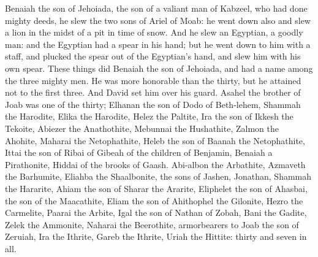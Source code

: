 Benaiah the son of Jehoiada, the son of a valiant man of Kabzeel, who had done mighty deeds, he slew the two sons of Ariel of Moab: he went down also and slew a lion in the midst of a pit in time of snow. And he slew an Egyptian, a goodly man: and the Egyptian had a spear in his hand; but he went down to him with a staff, and plucked the spear out of the Egyptian’s hand, and slew him with his own spear. These things did Benaiah the son of Jehoiada, and had a name among the three mighty men. He was more honorable than the thirty, but he attained not to the first three. And David set him over his guard.  Asahel the brother of Joab was one of the thirty; Elhanan the son of Dodo of Beth-lehem, Shammah the Harodite, Elika the Harodite, Helez the Paltite, Ira the son of Ikkesh the Tekoite, Abiezer the Anathothite, Mebunnai the Hushathite, Zalmon the Ahohite, Maharai the Netophathite, Heleb the son of Baanah the Netophathite, Ittai the son of Ribai of Gibeah of the children of Benjamin, Benaiah a Pirathonite, Hiddai of the brooks of Gaash. Abi-albon the Arbathite, Azmaveth the Barhumite, Eliahba the Shaalbonite, the sons of Jashen, Jonathan, Shammah the Hararite, Ahiam the son of Sharar the Ararite, Eliphelet the son of Ahasbai, the son of the Maacathite, Eliam the son of Ahithophel the Gilonite, Hezro the Carmelite, Paarai the Arbite, Igal the son of Nathan of Zobah, Bani the Gadite, Zelek the Ammonite, Naharai the Beerothite, armorbearers to Joab the son of Zeruiah, Ira the Ithrite, Gareb the Ithrite, Uriah the Hittite: thirty and seven in all. 

